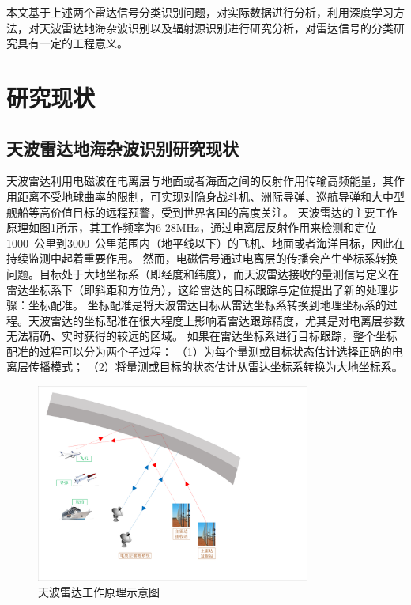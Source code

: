 本文基于上述两个雷达信号分类识别问题，对实际数据进行分析，利用深度学习方法，对天波雷达地海杂波识别以及辐射源识别进行研究分析，对雷达信号的分类研究具有一定的工程意义。

\section{研究现状}
\subsection{天波雷达地海杂波识别研究现状}
天波雷达利用电磁波在电离层与地面或者海面之间的反射作用传输高频能量，其作用距离不受地球曲率的限制，可实现对隐身战斗机、洲际导弹、巡航导弹和大中型舰船等高价值目标的远程预警，受到世界各国的高度关注。
天波雷达的主要工作原理如图\ref{fig:othr_how}所示，其工作频率为6-28MHz，通过电离层反射作用来检测和定位1000~公里到3000~公里范围内（地平线以下）的飞机、地面或者海洋目标，因此在持续监测中起着重要作用。
然而，电磁信号通过电离层的传播会产生坐标系转换问题。目标处于大地坐标系（即经度和纬度），而天波雷达接收的量测信号定义在雷达坐标系下（即斜距和方位角），这给雷达的目标跟踪与定位提出了新的处理步骤：坐标配准。
坐标配准是将天波雷达目标从雷达坐标系转换到地理坐标系的过程。天波雷达的坐标配准在很大程度上影响着雷达跟踪精度，尤其是对电离层参数无法精确、实时获得的较远的区域。
如果在雷达坐标系进行目标跟踪，整个坐标配准的过程可以分为两个子过程：
（1）为每个量测或目标状态估计选择正确的电离层传播模式；
（2）将量测或目标的状态估计从雷达坐标系转换为大地坐标系。
\begin{figure}[hbt]
	\centering
	\includegraphics[width=9cm]{figures/introduction/othr_work_new}
	\caption{天波雷达工作原理示意图}
	\label{fig:othr_how}
\end{figure}


